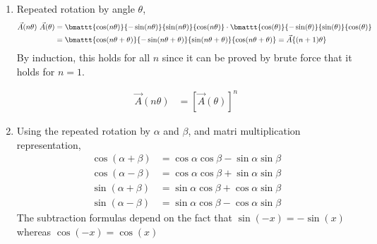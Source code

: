 \begin{enumerate}
\begin{enumerate}
              \item Repeated rotation by angle $ \theta $,
                    \begin{align}
                        \vec{A}(n\theta)\ \vec{A}(\theta) & = \bmattt
                        {\cos(n\theta)}{-\sin(n\theta)}
                        {\sin(n\theta)}{\cos(n\theta)} \cdot
                        \bmattt{\cos(\theta)}{-\sin(\theta)}
                        {\sin(\theta)}{\cos(\theta)}                  \\
                                                          & = \bmattt
                        {\cos(n\theta +\theta)}{-\sin(n\theta +\theta)}
                        {\sin(n\theta +\theta)}{\cos(n\theta +\theta)}
                        = \vec{A}\{(n+1)\theta\}
                    \end{align}
                    By induction, this holds for all $ n $ since it can be proved by
                    brute force that it holds for $ n = 1 $. \par
                    \begin{align}
                        \vec{A}(n\theta) & = [\vec{A}(\theta)]^n
                    \end{align}

              \item Using the repeated rotation by $ \alpha $ and $ \beta $, and
                    matri multiplication representation,
                    \begin{align}
                        \cos(\alpha + \beta) & = \cos \alpha \cos \beta
                        - \sin \alpha \sin \beta                        \\
                        \cos(\alpha - \beta) & = \cos \alpha \cos \beta
                        + \sin \alpha \sin \beta                        \\
                        \sin(\alpha + \beta) & = \sin \alpha \cos \beta
                        + \cos \alpha \sin \beta                        \\
                        \sin(\alpha - \beta) & = \sin \alpha \cos \beta
                        - \cos \alpha \sin \beta
                    \end{align}
                    The subtraction formulas depend on the fact that $ \sin(-x) =
                        -\sin(x) $ whereas $ \cos(-x) = \cos(x) $


\end{enumerate}
\end{enumerate}
